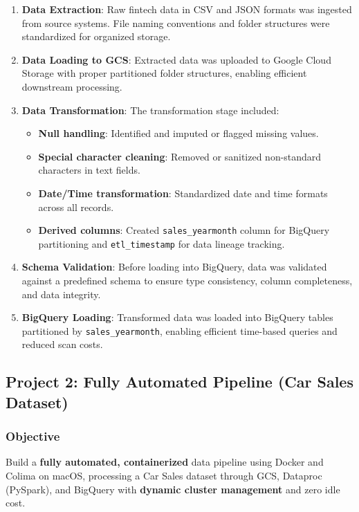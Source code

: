 \documentclass[12pt, a4paper]{article}
\begin{document}
\begin{enumerate}
    \item \textbf{Data Extraction}: Raw fintech data in CSV and JSON formats was ingested from source systems. File naming conventions and folder structures were standardized for organized storage.
    
    \item \textbf{Data Loading to GCS}: Extracted data was uploaded to Google Cloud Storage with proper partitioned folder structures, enabling efficient downstream processing.
    
    \item \textbf{Data Transformation}: The transformation stage included:
    \begin{itemize}
        \item \textbf{Null handling}: Identified and imputed or flagged missing values.
        \item \textbf{Special character cleaning}: Removed or sanitized non-standard characters in text fields.
        \item \textbf{Date/Time transformation}: Standardized date and time formats across all records.
        \item \textbf{Derived columns}: Created \texttt{sales\_yearmonth} column for BigQuery partitioning and \texttt{etl\_timestamp} for data lineage tracking.
    \end{itemize}
    
    \item \textbf{Schema Validation}: Before loading into BigQuery, data was validated against a predefined schema to ensure type consistency, column completeness, and data integrity.
    
    \item \textbf{BigQuery Loading}: Transformed data was loaded into BigQuery tables partitioned by \texttt{sales\_yearmonth}, enabling efficient time-based queries and reduced scan costs.
\end{enumerate}

\subsection{Project 2: Fully Automated Pipeline (Car Sales Dataset)}

\subsubsection{Objective}
\noindent Build a \textbf{fully automated, containerized} data pipeline using Docker and Colima on macOS, processing a Car Sales dataset through GCS, Dataproc (PySpark), and BigQuery with \textbf{dynamic cluster management} and zero idle cost.
\end{document}
